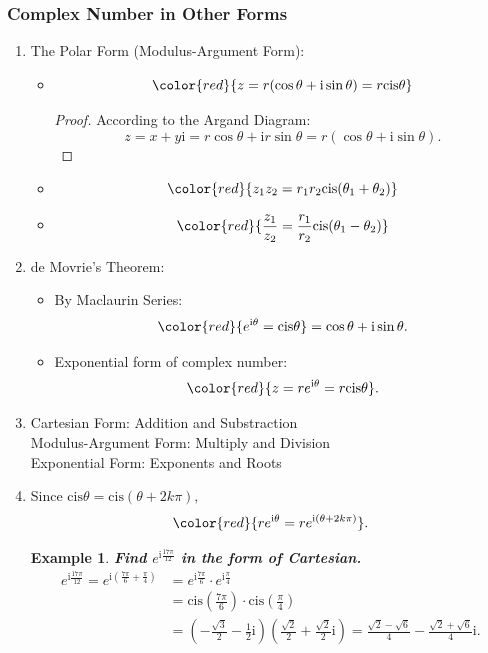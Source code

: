 \documentclass[12pt, a4paper]{article}
\newtheorem{example}{Example}[subsection]
\newtheorem{proof}{Proof}[subsection]
\def\i{{\mathrm{i}}}
\def\cis{\mathrm{cis}}
\begin{document}
\subsubsection{Complex Number in Other Forms}
\begin{enumerate}
  \item The Polar Form (Modulus-Argument Form): 
  \begin{itemize}
    \item $${\color{red}{z=r(\cos\theta+\i\sin\theta)=r\cis\theta}}$$
    \begin{proof}
      According to the Argand Diagram: 
      $$z=x+y\i=r\cos\theta+\i r\sin\theta=r(\cos\theta+\i\sin\theta).$$
    \end{proof}
    \item $${\color{red}{z_1z_2=r_1r_2\cis(\theta_1+\theta_2)}}$$
    \item $${\color{red}{\frac{z_1}{z_2}=\frac{r_1}{r_2}\cis(\theta_1-\theta_2)}}$$
  \end{itemize}
  \item de Movrie's Theorem: 
  \begin{itemize}
    \item By Maclaurin Series: $${\color{red}{e^{\i\theta}=\cis\theta}}=\cos\theta+\i\sin\theta.$$
    \item Exponential form of complex number: 
    $${\color{red}{z=re^{\i\theta}=r\cis\theta}}.$$
  \end{itemize}
  \item Cartesian Form: Addition and Substraction\\
  Modulus-Argument Form: Multiply and Division\\
  Exponential Form: Exponents and Roots
  \item Since $\cis\theta=\cis(\theta+2k\pi),$ 
  $${\color{red}{re^{\i\theta}=re^{\i(\theta+2k\pi)}}}.$$
  \begin{example}
    \textbf{Find $e^{\i\frac{17\pi}{12}}$ in the form of Cartesian.}
    $$\begin{aligned}
      e^{\i\frac{17\pi}{12}}=e^{\i\left(\frac{7\pi}{6}+\frac{\pi}{4}\right)}&=e^{\i\frac{7\pi}{6}}\cdot e^{\i\frac{\pi}{4}}\\
      &=\cis\left(\frac{7\pi}{6}\right)\cdot\cis\left(\frac{\pi}{4}\right)\\
      &=\left(-\frac{\sqrt{3}}{2}-\frac{1}{2}\i\right)\left(\frac{\sqrt{2}}{2}+\frac{\sqrt{2}}{2}\i\right)=\frac{\sqrt{2}-\sqrt{6}}{4}-\frac{\sqrt{2}+\sqrt{6}}{4}\i.
    \end{aligned}$$
  \end{example}
\end{enumerate}
\end{document}
